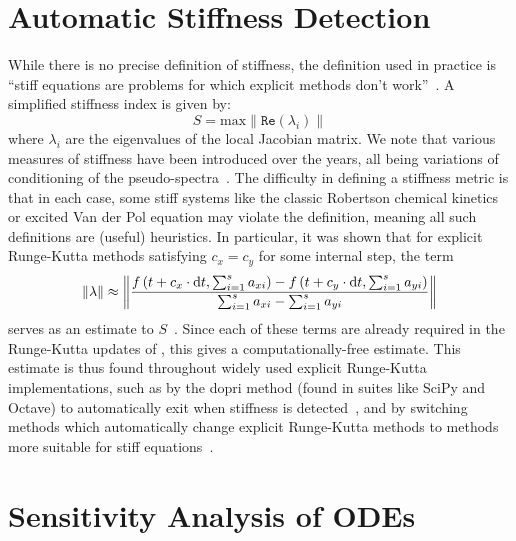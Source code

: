 
\section{Automatic Stiffness Detection}
\label{sec:automatic_stiffness_detection}

While there is no precise definition of stiffness, the definition used in practice is ``stiff equations are problems for which explicit methods don't work''~\citep{wanner1996solving,shampine1979user}. A simplified stiffness index is given by:
%
\begin{equation}
  S = \text{max}\|\texttt{Re}(\lambda_i)\|
\end{equation}
%
where $\lambda_i$ are the eigenvalues of the local Jacobian matrix. We note that various measures of stiffness have been introduced over the years, all being variations of conditioning of the pseudo-spectra~\citep{shampine2007stiff, higham1993stiffness}. The difficulty in defining a stiffness metric is that in each case, some stiff systems like the classic Robertson chemical kinetics or excited Van der Pol equation may violate the definition, meaning all such definitions are (useful) heuristics. In particular, it was shown that for explicit Runge-Kutta methods satisfying $c_x = c_y$ for some internal step, the term
%
\begin{equation}
  \|\lambda\| \approx \left\Vert\frac{ f\left(t + c_x \cdot \mathrm{d}t,\sum_{i=1}^{s} a_{xi}\right) - f\left(t + c_y \cdot \mathrm{d}t,\sum_{i=1}^{s} a_{yi}\right)}{\sum_{i=1}^{s} a_{xi} - \sum_{i=1}^{s} a_{yi}}\right\Vert
\end{equation}
%
serves as an estimate to $S$~\citep{shampine1977stiffness}. Since each of these terms are already required in the Runge-Kutta updates of , this gives a computationally-free estimate. This estimate is thus found throughout widely used explicit Runge-Kutta implementations, such as by the dopri method (found in suites like SciPy and Octave) to automatically exit when stiffness is detected~\citep{wanner1996solving}, and by switching methods which automatically change explicit Runge-Kutta methods to methods more suitable for stiff equations~\citep{rackauckas2019confederated}.

\section{Sensitivity Analysis of ODEs}
\label{sec:sensitivity_analysis_odes}


